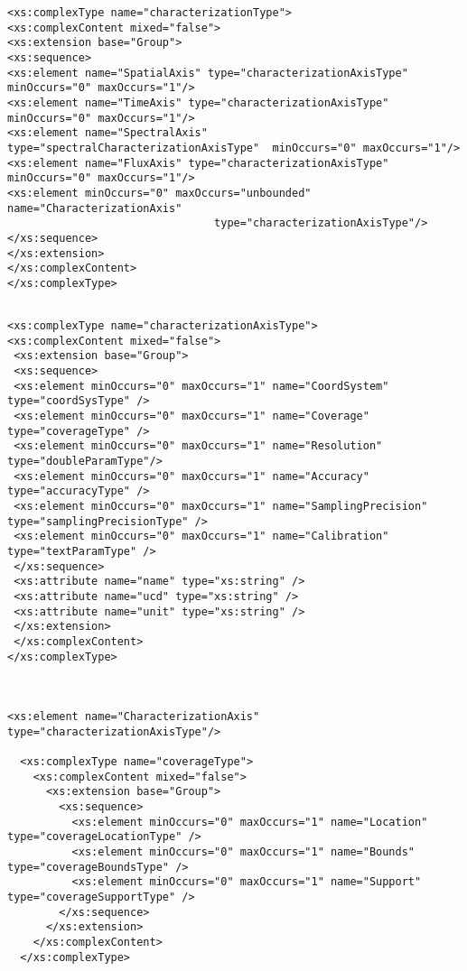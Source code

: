 {\begin{flushleft}
\begin{fmppage}
\begin{verbatim}
<xs:complexType name="characterizationType">
<xs:complexContent mixed="false">
<xs:extension base="Group">
<xs:sequence>
<xs:element name="SpatialAxis" type="characterizationAxisType" minOccurs="0" maxOccurs="1"/>
<xs:element name="TimeAxis" type="characterizationAxisType"  minOccurs="0" maxOccurs="1"/>
<xs:element name="SpectralAxis" type="spectralCharacterizationAxisType"  minOccurs="0" maxOccurs="1"/>
<xs:element name="FluxAxis" type="characterizationAxisType"  minOccurs="0" maxOccurs="1"/>
<xs:element minOccurs="0" maxOccurs="unbounded" name="CharacterizationAxis"
                                type="characterizationAxisType"/>
</xs:sequence>
</xs:extension>
</xs:complexContent>
</xs:complexType>

\end{verbatim}
\end{fmppage}

\begin{fmppage}
\begin{verbatim}

<xs:complexType name="characterizationAxisType">
<xs:complexContent mixed="false">
 <xs:extension base="Group">
 <xs:sequence>
 <xs:element minOccurs="0" maxOccurs="1" name="CoordSystem" type="coordSysType" /> 
 <xs:element minOccurs="0" maxOccurs="1" name="Coverage" type="coverageType" />
 <xs:element minOccurs="0" maxOccurs="1" name="Resolution" type="doubleParamType"/>
 <xs:element minOccurs="0" maxOccurs="1" name="Accuracy" type="accuracyType" />
 <xs:element minOccurs="0" maxOccurs="1" name="SamplingPrecision" type="samplingPrecisionType" /> 
 <xs:element minOccurs="0" maxOccurs="1" name="Calibration" type="textParamType" />
 </xs:sequence>
 <xs:attribute name="name" type="xs:string" />
 <xs:attribute name="ucd" type="xs:string" />
 <xs:attribute name="unit" type="xs:string" />   
 </xs:extension>
 </xs:complexContent>
</xs:complexType>



<xs:element name="CharacterizationAxis" type="characterizationAxisType"/>

  <xs:complexType name="coverageType">
    <xs:complexContent mixed="false">
      <xs:extension base="Group">
        <xs:sequence>
          <xs:element minOccurs="0" maxOccurs="1" name="Location" type="coverageLocationType" />
          <xs:element minOccurs="0" maxOccurs="1" name="Bounds" type="coverageBoundsType" />
          <xs:element minOccurs="0" maxOccurs="1" name="Support" type="coverageSupportType" />
        </xs:sequence>
      </xs:extension>
    </xs:complexContent>
  </xs:complexType>


\end{verbatim}
\end{fmppage}
\end{flushleft}}
